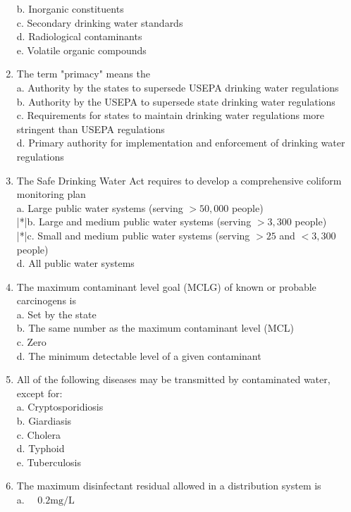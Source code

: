 \begin{enumerate}
b. Inorganic constituents\\
c. Secondary drinking water standards\\
d. Radiological contaminants\\
e. Volatile organic compounds\\
\item The term "primacy" means the\\
a. Authority by the states to supersede USEPA drinking water regulations\\
b. Authority by the USEPA to supersede state drinking water regulations\\
c. Requirements for states to maintain drinking water regulations more stringent than USEPA regulations\\
d. Primary authority for implementation and enforcement of drinking water regulations\\
\item The Safe Drinking Water Act requires to develop a comprehensive coliform monitoring plan\\
a. Large public water systems (serving $>50,000$ people)\\
|*|b. Large and medium public water systems (serving $>3,300$ people)\\
|*|c. Small and medium public water systems (serving $>25$ and $<3,300$ people)\\
d. All public water systems\\
\item The maximum contaminant level goal (MCLG) of known or probable carcinogens is\\
a. Set by the state\\
b. The same number as the maximum contaminant level (MCL)\\
c. Zero\\
d. The minimum detectable level of a given contaminant\\
\item All of the following diseases may be transmitted by contaminated water, except for:\\
a. Cryptosporidiosis\\
b. Giardiasis\\
c. Cholera\\
d. Typhoid\\
e. Tuberculosis\\
\item The maximum disinfectant residual allowed in a distribution system is\\
a. $\quad 0.2 \mathrm{mg} / \mathrm{L}$\\

\end{enumerate}
